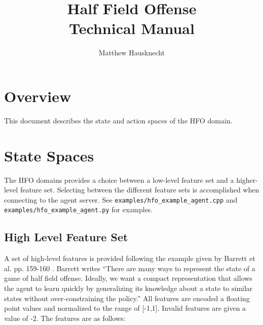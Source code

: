 \documentclass[12pt]{article}
\title{Half Field Offense \\ Technical Manual}
\author{Matthew Hausknecht}
\begin{document}
\maketitle
\tableofcontents

\section{Overview}

This document describes the state and action spaces of the HFO domain.

\section{State Spaces}

The HFO domains provides a choice between a low-level feature set and
a higher-level feature set. Selecting between the different feature
sets is accomplished when connecting to the agent server. See
\verb|examples/hfo_example_agent.cpp| and 
\verb|examples/hfo_example_agent.py| for examples.

\subsection{High Level Feature Set}
A set of high-level features is provided following the example given
by Barrett et al. pp. 159-160 \cite{THESIS14-Barrett}. Barrett writes
``There are many ways to represent the state of a game of half field
offense.  Ideally, we want a compact representation that allows the
agent to learn quickly by generalizing its knowledge about a state to
similar states without over-constraining the policy.'' All features
are encoded a floating point values and normalized to the range of
[-1,1]. Invalid features are given a value of -2. The features are as
follows:
\end{document}

